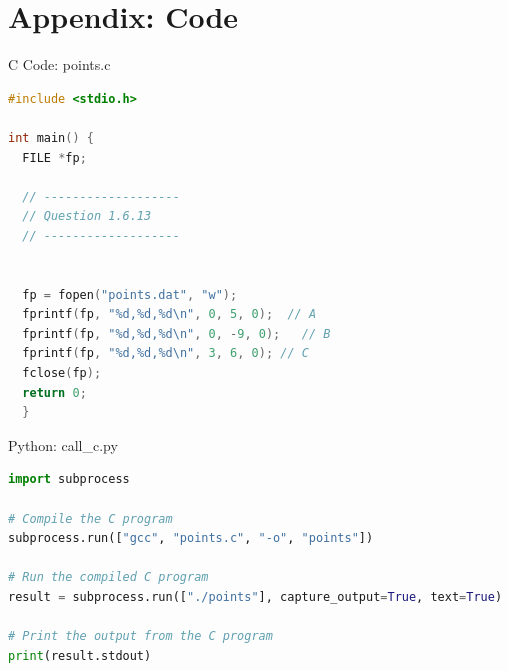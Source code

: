 \documentclass{beamer}
\numberwithin{equation}{section}
\theoremstyle{remark}
\begin{document}
\section*{Appendix: Code}

\begin{frame}[fragile]{C Code: points.c}
\begin{lstlisting}[language=C]
#include <stdio.h>

int main() {
  FILE *fp;

  // -------------------
  // Question 1.6.13
  // -------------------


  fp = fopen("points.dat", "w");
  fprintf(fp, "%d,%d,%d\n", 0, 5, 0);  // A
  fprintf(fp, "%d,%d,%d\n", 0, -9, 0);   // B
  fprintf(fp, "%d,%d,%d\n", 3, 6, 0); // C
  fclose(fp);
  return 0;
  }
\end{lstlisting}
\end{frame}

\begin{frame}[fragile]{Python: call\_c.py}
\begin{lstlisting}[language=Python]
import subprocess

# Compile the C program
subprocess.run(["gcc", "points.c", "-o", "points"])

# Run the compiled C program
result = subprocess.run(["./points"], capture_output=True, text=True)

# Print the output from the C program
print(result.stdout)
\end{lstlisting}
\end{frame}
\end{document}
